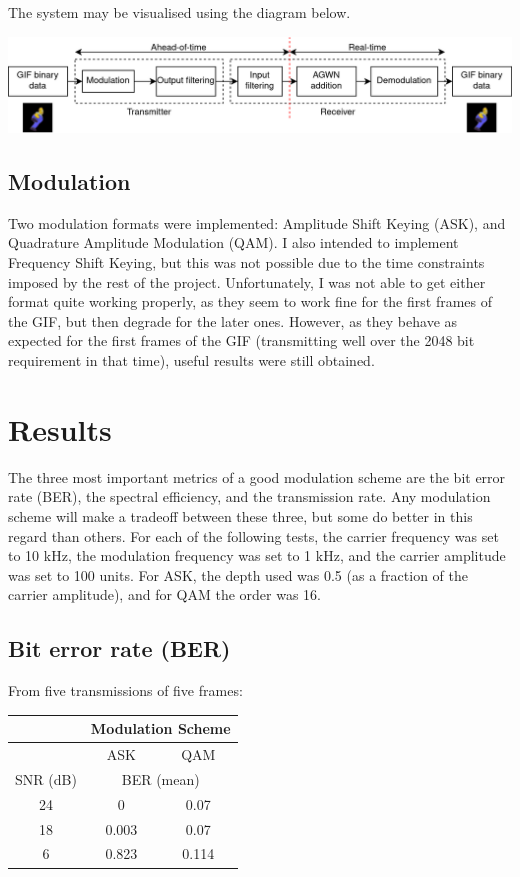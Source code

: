 \documentclass{article}
\begin{document}
The system may be visualised using the diagram below. 

\noindent
\includegraphics[width=\textwidth]{figures/system-diagram.png}

\subsection{Modulation}
Two modulation formats were implemented: Amplitude Shift Keying (ASK), and Quadrature Amplitude Modulation (QAM). I also intended to implement Frequency Shift Keying, but this was not possible due to the time constraints imposed by the rest of the project. Unfortunately, I was not able to get either format quite working properly, as they seem to work fine for the first frames of the GIF, but then degrade for the later ones. However, as they behave as expected for the first frames of the GIF (transmitting well over the 2048 bit requirement in that time), useful results were still obtained.

\section{Results}
The three most important metrics of a good modulation scheme are the bit error rate (BER), the spectral efficiency, and the transmission rate. Any modulation scheme will make a tradeoff between these three, but some do better in this regard than others. For each of the following tests, the carrier frequency was set to 10 kHz, the modulation frequency was set to 1 kHz, and the carrier amplitude was set to 100 units. For ASK, the depth used was 0.5 (as a fraction of the carrier amplitude), and for QAM the order was 16.   

\subsection{Bit error rate (BER)}
From five transmissions of five frames:
\begin{center}
    \begin{tabular}{|c|c|c|}
        \hline
                 & \multicolumn{2}{c|}{Modulation Scheme}         \\ \hline
                 & ASK                                    & QAM   \\ \hline
        SNR (dB) & \multicolumn{2}{c|}{BER (mean)}                \\ \hline
        24       & 0                                      & 0.07  \\
        18       & 0.003                                  & 0.07  \\
        6        & 0.823                                  & 0.114 \\ \hline
    \end{tabular}
\end{center}
\end{document}
